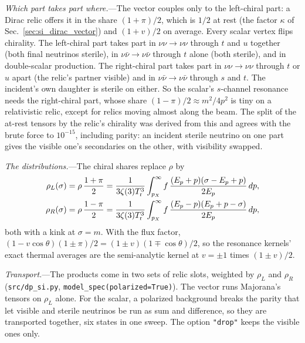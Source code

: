 \documentclass[11pt,a4paper]{article}
\newcommand{\file}[1]{\nolinkurl{#1}}
\begin{document}
\textit{Which part takes part where.}---The vector couples only to the left-chiral part: a Dirac
relic offers it in the share $(1+\pi)/2$, which is $1/2$ at rest (the factor $\kappa$ of
Sec.~\ref{sec:si_dirac_vector}) and $(1+v)/2$ on average. Every scalar vertex flips chirality. The
left-chiral part takes part in $\nu\nu\to\nu\nu$ through $t$ and $u$ together (both final neutrinos
sterile), in $\nu\bar\nu\to\nu\bar\nu$ through $t$ alone (both sterile), and in double-scalar
production. The right-chiral part takes part in $\nu\nu\to\nu\nu$ through $t$ or $u$ apart (the
relic's partner visible) and in $\nu\bar\nu\to\nu\bar\nu$ through $s$ and $t$. The incident's own
daughter is sterile on either. So the scalar's $s$-channel resonance needs the right-chiral part,
whose share $(1-\pi)/2 \approx m^2/4p^2$ is tiny on a relativistic relic, except for relics moving
almost along the beam. The split of the at-rest tensors by the relic's chirality was derived from
this and agrees with the brute force to $10^{-15}$, including parity: an incident sterile neutrino
on one part gives the visible one's secondaries on the other, with visibility swapped.

\textit{The distributions.}---The chiral shares replace $\rho$ by
\begin{align}
\rho_L(\sigma) &= \rho\,\frac{1+\pi}{2}
= \frac{1}{3\zeta(3)T_{\rm r}^3}\int_{p_X}^\infty f\,\frac{(E_p + p)(\sigma - E_p + p)}{2E_p}\,dp, \\
\rho_R(\sigma) &= \rho\,\frac{1-\pi}{2}
= \frac{1}{3\zeta(3)T_{\rm r}^3}\int_{p_X}^\infty f\,\frac{(E_p - p)(E_p + p - \sigma)}{2E_p}\,dp,
\end{align}
both with a kink at $\sigma = m$. With the flux factor, $(1 - v\cos\theta)(1\pm\pi)/2 =
(1\pm v)(1\mp\cos\theta)/2$, so the resonance kernels' exact thermal averages are the semi-analytic
kernel at $v = \pm1$ times $(1\pm v)/2$.

\textit{Transport.}---The products come in two sets of relic slots, weighted by $\rho_L$ and
$\rho_R$ (\file{src/dp\_si.py}, \texttt{model\_spec(polarized=True)}). The vector runs Majorana's
tensors on $\rho_L$ alone. For the scalar, a polarized background breaks the parity that let
visible and sterile neutrinos be run as sum and difference, so they are transported together, six
states in one sweep. The option \texttt{"drop"} keeps the visible ones only.
\end{document}
